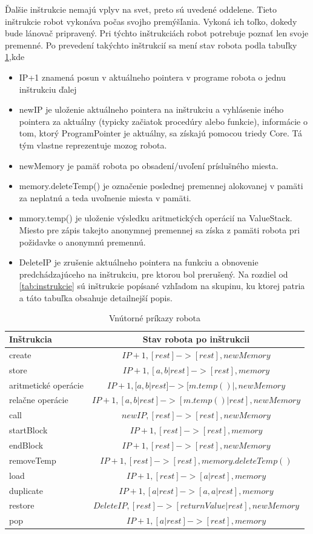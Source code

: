 Ďalšie inštrukcie nemajú vplyv na svet, preto sú uvedené oddelene. Tieto inštrukcie robot vykonáva počas svojho premýšľania. Vykoná ich toľko, dokedy bude lánovač pripravený. Pri týchto inštrukciách robot potrebuje poznať len svoje premenné. Po prevedení takýchto inštrukcií sa mení stav robota podla tabuľky \ref{VnutroBota},kde
\begin{itemize}
\item IP+1 znamená posun v aktuálneho pointera v programe robota o jednu inštrukciu ďalej
\item newIP je uloženie aktuálneho pointera na inštrukciu a vyhlásenie iného pointera za aktuálny (typicky začiatok procedúry alebo funkcie), informácie o tom, ktorý ProgramPointer je aktuálny, sa získajú pomocou triedy Core. Tá tým vlastne reprezentuje mozog robota.
\item newMemory je pamäť robota po obsadení/uvoľení príslušného miesta.
\item memory.deleteTemp() je označenie poslednej premennej alokovanej v pamäti za neplatnú a teda uvoľnenie miesta v pamäti.
\item mmory.temp() je uloženie výsledku aritmetických operácií na ValueStack. Miesto pre zápis takejto anonymnej premennej sa získa z pamäti robota pri požidavke o anonymnú premennú.
\item DeleteIP je zrušenie aktuálneho pointera na funkciu a obnovenie predchádzajúceho na inštrukciu, pre ktorou bol prerušený. 
Na rozdiel od \ref{tab:instrukcie} sú inštrukcie popísané vzhľadom na skupinu, ku ktorej patria a táto tabuľka obsahuje detailnejší popis.
\end{itemize}

\begin{table}[ht]
\centering
\caption{Vnútorné príkazy robota}
\begin{tabular}{|l|c|}
\hline\hline
Inštrukcia & Stav robota po inštrukcii \\
\hline
create & $ IP+1, [rest]->[rest], newMemory$ \\
store & $ IP+1, [a,b|rest]->[rest], memory$ \\
aritmetické operácie & $IP+1, [a,b|rest]->[m.temp()|, newMemory$ \\
relačne operácie & $IP+1, [a,b|rest]->[m.temp()|rest], newMemory$ \\
call &  $ newIP, [rest]->[rest], newMemory$\\
startBlock & $IP+1, [rest]->[rest], memory$\\
endBlock & $IP+1, [rest]->[rest], newMemory$\\
removeTemp & $IP+1, [rest]->[rest], memory.deleteTemp()$\\
load & $ IP+1, [rest]->[a|rest], memory$\\
duplicate & $ IP+1, [a|rest]->[a,a|rest], memory$\\
restore & $ DeleteIP, [rest]->[returnValue|rest], newMemory$\\
pop & $ IP+1, [a|rest]->[rest], memory$\\
\hline
\end{tabular}
\label{VnutroBota}
\end{table}
